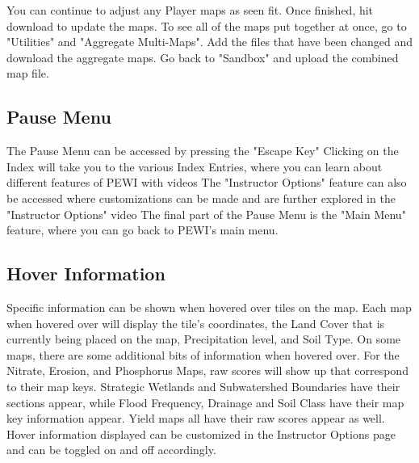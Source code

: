 \documentclass[11pt]{article}
\begin{document}
\begin{itemize}
You can continue to adjust any Player maps as seen fit. Once finished, hit download to update the maps. To see all of the maps put together at once, go to "Utilities" and "Aggregate Multi-Maps". Add the files that have been changed and download the aggregate maps. Go back to "Sandbox" and upload the combined map file.

\subsection{Pause Menu}
The Pause Menu can be accessed by pressing the "Escape Key" Clicking on the Index will take you to the various Index Entries, where you can learn about different features of PEWI with videos The "Instructor Options" feature can also be accessed where customizations can be made and are further explored in the "Instructor Options" video The final part of the Pause Menu is the "Main Menu" feature, where you can go back to PEWI's main menu.

\subsection{Hover Information}
Specific information can be shown when hovered over tiles on the map. Each map when hovered over will display the tile's coordinates, the Land Cover that is currently being placed on the map, Precipitation level, and Soil Type. On some maps, there are some additional bits of information when hovered over. For the Nitrate, Erosion, and Phosphorus Maps, raw scores will show up that correspond to their map keys. Strategic Wetlands and Subwatershed Boundaries have their sections appear, while Flood Frequency, Drainage and Soil Class have their map key information appear. Yield maps all have their raw scores appear as well. Hover information displayed can be customized in the Instructor Options page and can be toggled on and off accordingly.  


\end{itemize}
\end{document}
